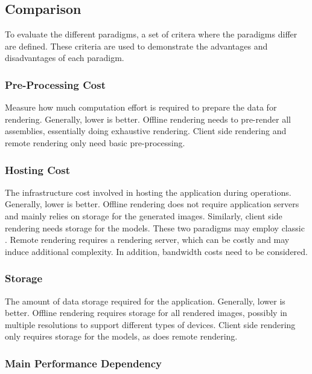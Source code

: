 \subsection*{Comparison}

To evaluate the different paradigms, a set of critera where the paradigms differ are defined. These criteria are used to demonstrate the advantages and disadvantages of each paradigm.

\subsubsection{Pre-Processing Cost}

Measure how much computation effort is required to prepare the data for rendering. Generally, lower is better. Offline rendering needs to pre-render all assemblies, essentially doing exhaustive rendering. Client side rendering and remote rendering only need basic pre-processing.

\subsubsection{Hosting Cost}

The infrastructure cost involved in hosting the application during operations. Generally, lower is better. Offline rendering does not require application servers and mainly relies on storage for the generated images. Similarly, client side rendering needs storage for the models. These two paradigms may employ classic . Remote rendering requires a rendering server, which can be costly and may induce additional complexity. In addition, bandwidth costs need to be considered.

\subsubsection{Storage}

The amount of data storage required for the application. Generally, lower is better. Offline rendering requires storage for all rendered images, possibly in multiple resolutions to support different types of devices. Client side rendering only requires storage for the models, as does remote rendering.

\subsubsection{Main Performance Dependency}

